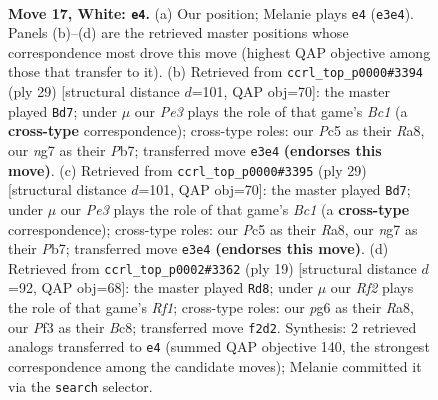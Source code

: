 \documentclass[11pt]{article}
\begin{document}
\clearpage

\begin{figure}[p]\centering
\begin{subfigure}{0.46\textwidth}\centering
\resizebox{\linewidth}{!}{%
\newchessgame
\chessboard[
  setfen={rn2bbr1/1p2k1np/p3p1p1/2P2p2/P1B5/2N1PP2/1P3RPP/1RB1N1K1 w - - 2 17},
  showmover=false,
  pgfstyle=straightmove, color=movearrow, markmove={e3-e4}
]}
\caption{}
\end{subfigure}\hfill
\begin{subfigure}{0.46\textwidth}\centering
\resizebox{\linewidth}{!}{%
\newchessgame
\chessboard[
  setfen={r1b1r1k1/ppp2p1p/8/3n1p2/1b1Np3/1P2P3/PB1PBPPP/R3K2R b KQ - 1 15},
  showmover=false,
  pgfstyle=straightmove, color=movearrow, markmove={c8-d7}
]}
\caption{}
\end{subfigure}
\\[4pt]
\begin{subfigure}{0.46\textwidth}\centering
\resizebox{\linewidth}{!}{%
\newchessgame
\chessboard[
  setfen={r1b1r1k1/ppp2p1p/8/3n1p2/1b1Np3/1P2P3/PB1PBPPP/R3K2R b KQ - 1 15},
  showmover=false,
  pgfstyle=straightmove, color=movearrow, markmove={c8-d7}
]}
\caption{}
\end{subfigure}\hfill
\begin{subfigure}{0.46\textwidth}\centering
\resizebox{\linewidth}{!}{%
\newchessgame
\chessboard[
  setfen={r1b2rk1/pp2pp1p/2n2npb/2p5/4PP2/2PBBN2/PP2K1PP/RN5R b - - 8 10},
  showmover=false,
  pgfstyle=straightmove, color=movearrow, markmove={f8-d8}
]}
\caption{}
\end{subfigure}
\caption{\textbf{Move 17, White: \texttt{e4}.} (a) Our position; Melanie plays \texttt{e4} (\texttt{e3e4}). Panels (b)--(d) are the retrieved master positions whose correspondence most drove this move (highest QAP objective among those that transfer to it). (b) Retrieved from \texttt{ccrl\_top\_p0000\#3394} (ply 29) [structural distance $d$=101, QAP obj=70]: the master played \texttt{Bd7}; under $\mu$ our \emph{Pe3} plays the role of that game's \emph{Bc1} (a \textbf{cross-type} correspondence); cross-type roles: our \emph{P}c5 as their \emph{R}a8, our \emph{n}g7 as their \emph{P}b7; transferred move \texttt{e3e4} \textbf{(endorses this move)}. (c) Retrieved from \texttt{ccrl\_top\_p0000\#3395} (ply 29) [structural distance $d$=101, QAP obj=70]: the master played \texttt{Bd7}; under $\mu$ our \emph{Pe3} plays the role of that game's \emph{Bc1} (a \textbf{cross-type} correspondence); cross-type roles: our \emph{P}c5 as their \emph{R}a8, our \emph{n}g7 as their \emph{P}b7; transferred move \texttt{e3e4} \textbf{(endorses this move)}. (d) Retrieved from \texttt{ccrl\_top\_p0002\#3362} (ply 19) [structural distance $d$=92, QAP obj=68]: the master played \texttt{Rd8}; under $\mu$ our \emph{Rf2} plays the role of that game's \emph{Rf1}; cross-type roles: our \emph{p}g6 as their \emph{R}a8, our \emph{P}f3 as their \emph{B}c8; transferred move \texttt{f2d2}. Synthesis: 2 retrieved analogs transferred to \texttt{e4} (summed QAP objective 140, the strongest correspondence among the candidate moves); Melanie committed it via the \texttt{search} selector.}
\label{fig:thought-m32}
\end{figure}
\end{document}
